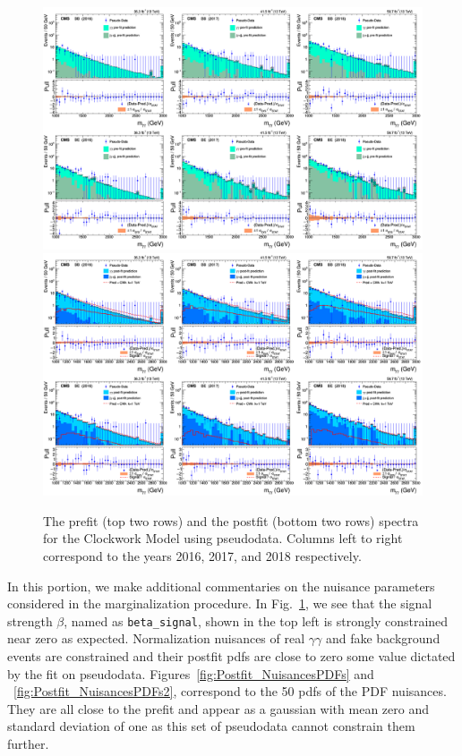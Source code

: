 \begin{spacing}{2}
\begin{figure}[h!]\centering
\includegraphics[width=1.\linewidth]{fig/PRED_PRE_CWk.png}
\includegraphics[width=1.\linewidth]{fig/PRED_POST_CWk.png}
\caption{The prefit (top two rows) and the postfit (bottom two rows) \mgg spectra for the Clockwork Model using pseudodata.
Columns left to right correspond to the years 2016, 2017, and 2018 respectively.}
\label{Fig:Postfit_mgg_Clockwork_pseudo}
\end{figure}

In this portion, we make additional commentaries on the nuisance parameters considered in the marginalization procedure. In Fig.~\ref{Fig:Postfit_mgg_Clockwork_pseudo}, we see that the signal strength $\beta$, named as \texttt{beta\_signal}, shown in the top left is strongly constrained near zero as expected. Normalization nuisances of real $\gamma\gamma$ and fake background events are  constrained and their postfit pdfs are close to zero some value dictated by the fit on pseudodata. Figures~\ref{fig:Postfit_NuisancesPDFs} and ~\ref{fig:Postfit_NuisancesPDFs2}, correspond to the 50 pdfs of the PDF nuisances. They are all close to the prefit and appear as a gaussian with mean zero and standard deviation of one as this set of pseudodata cannot constrain them further.


\end{spacing}
